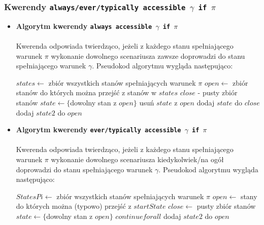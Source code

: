 \documentclass{article}
\begin{document}
\subsubsection{Kwerendy \texttt{always/ever/typically accessible $\gamma$ if $\pi$} }
\begin{itemize}
    \item \textbf{Algorytm kwerendy \texttt{always accessible $\gamma$ if $\pi$}}\\\\
Kwerenda odpowiada twierdząco, jeżeli z każdego stanu spełniającego warunek $\pi$ wykonanie dowolnego scenariusza zawsze doprowadzi do stanu spełniającego warunek $\gamma$. Pseudokod algorytmu wygląda następująco:

\begin{algorithm}[H]
\begin{algorithmic}
\State $states \gets $ zbiór wszystkich stanów spełniających warunek $\pi$ 
\State $open \gets $ zbiór stanów do których można przejść z stanów w $states$
\State $close$ - pusty zbiór stanów
    \State $state \gets \{$dowolny stan z $open\}$
    \State usuń $state$ z $open$
	\State dodaj $state$ do $close$
		    \State dodaj $state2$ do $open$
		\EndIf
	\EndFor
\EndWhile
	    \State {}
	\EndIf
\State {}
\end{algorithmic}
\end{algorithm}
\newpage
    \item \textbf{Algorytm kwerendy \texttt{ever/typically accessible $\gamma$ if $\pi$}}\\\\
Kwerenda odpowiada twierdząco, jeżeli z każdego stanu spełniającego warunek $\pi$ wykonanie dowolnego scenariusza kiedykolwiek/na ogół doprowadzi do stanu spełniającego warunek $\gamma$. Pseudokod algorytmu wygląda następująco:

\begin{algorithm}[H]
\begin{algorithmic}
\State $StatesPi \gets $ zbiór wszystkich stanów spełniających warunek $\pi$ 
    \State $open \gets$ stany do których można (typowo) przejść z $startState$
    \State $close \gets$ pusty zbiór stanów
        \State $state \gets \{$dowolny stan z $open\}$
            \State $continue for all$
        \EndIf
                \State dodaj $state2$ do $open$
            \EndIf
        \EndFor
    \EndWhile
    \State {}
\EndFor
\State {}
\end{algorithmic}
\end{algorithm}
\end{itemize}
\end{document}
